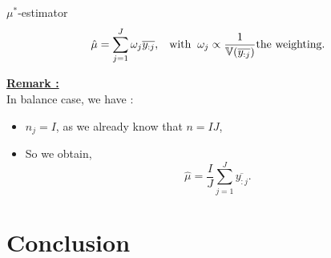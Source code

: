 \documentclass[unknownkeysallowed]{beamer}
\begin{document}
\begin{frame}{$\mu^*$-estimator}
{\[ \hat{\mu} = \sum_{j=1}^J \omega_j \overline{y_{:j}} , \hspace{0.3cm}  \text{with} \hspace{0.2cm} \omega_j \propto \frac{1}{\mathbb{V}(\overline{y_{:j}})} \text{the weighting}. \]}
\medskip

\vspace{1cm}
\underline{\textbf{Remark :}}\\
In balance case, we have :
\begin{itemize}
    \item $n_j = I$, as we already know that $n = IJ$,
    \item So we obtain, \[ \hat{\mu}=\frac{I}{J}\sum_{j=1}^J\overline{y_{:j}}. \]
\end{itemize}
     
\end{frame}




\section{Conclusion}
\label{sec:conclusion}
\end{document}
